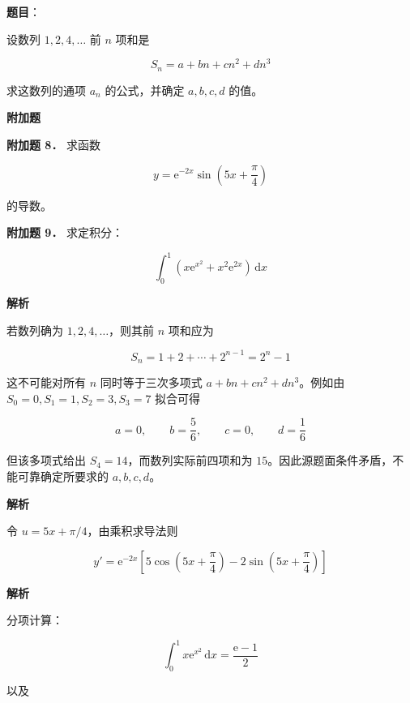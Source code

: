 \begin{answer}

\textbf{题目}：

设数列 $1,2,4,\ldots$ 前 $n$ 项和是

\nopagebreak[4]
\[
S_n=a+bn+cn^2+dn^3
\]

求这数列的通项 $a_n$ 的公式，并确定 $a,b,c,d$ 的值。

\begin{gktip}
\Needspace{0.25\textheight}
\textbf{附加题}
\end{gktip}

\textbf{附加题 8．} 求函数

\nopagebreak[4]
\[
y=\mathrm e^{-2x}\sin\left(5x+\frac\pi4\right)
\]

的导数。

\textbf{附加题 9．} 求定积分：

\nopagebreak[4]
\[
\int_0^1\left(x\mathrm e^{x^2}+x^2\mathrm e^{2x}\right)\,\mathrm dx
\]

\textbf{解析}

若数列确为 $1,2,4,\ldots$，则其前 $n$ 项和应为

\nopagebreak[4]
\[
S_n=1+2+\cdots+2^{n-1}=2^n-1
\]

这不可能对所有 $n$ 同时等于三次多项式 $a+bn+cn^2+dn^3$。例如由 $S_0=0,S_1=1,S_2=3,S_3=7$ 拟合可得

\nopagebreak[4]
\[
a=0,\qquad b=\frac56,\qquad c=0,\qquad d=\frac16
\]

但该多项式给出 $S_4=14$，而数列实际前四项和为 $15$。因此源题面条件矛盾，不能可靠确定所要求的 $a,b,c,d$。


\textbf{解析}

令 $u=5x+\pi/4$，由乘积求导法则

\nopagebreak[4]
\[
y'=\mathrm e^{-2x}\left[5\cos\left(5x+\frac\pi4\right)-2\sin\left(5x+\frac\pi4\right)\right]
\]


\textbf{解析}

分项计算：

\nopagebreak[4]
\[
\int_0^1x\mathrm e^{x^2}\,\mathrm dx=\frac{\mathrm e-1}{2}
\]

以及


\end{answer}
